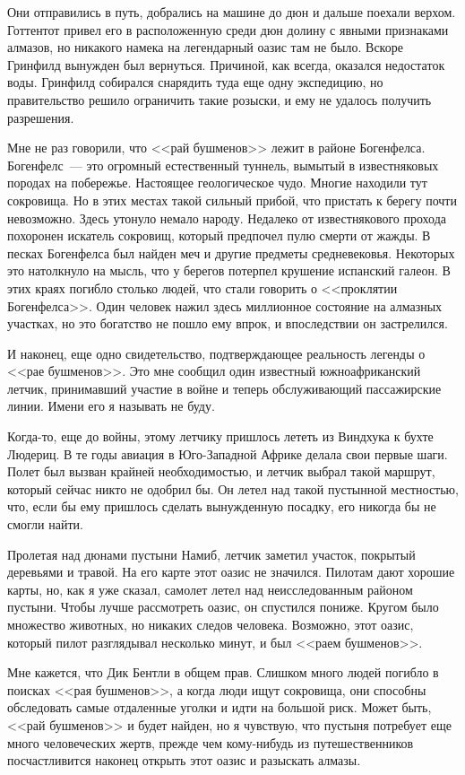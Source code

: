 \documentclass[12pt,a4paper,twoside,openany,svgnames]{memoir}
\begin{document}
Они отправились в путь, добрались на машине до дюн и дальше поехали верхом. Готтентот привел его в расположенную среди дюн долину с явными признаками алмазов, но никакого намека на легендарный оазис там не было. Вскоре Гринфилд вынужден был вернуться. Причиной, как всегда, оказался недостаток воды. Гринфилд собирался снарядить туда еще одну экспедицию, но правительство решило ограничить такие розыски, и ему не удалось получить разрешения.

Мне не раз говорили, что <<рай бушменов>> лежит в районе Богенфелса. Богенфелс~--- это огромный естественный туннель, вымытый в известняковых породах на побережье. Настоящее геологическое чудо. Многие находили тут сокровища. Но в этих местах такой сильный прибой, что пристать к берегу почти невозможно. Здесь утонуло немало народу. Недалеко от известнякового прохода похоронен искатель сокровищ, который предпочел пулю смерти от жажды. В песках Богенфелса был найден меч и другие предметы средневековья. Некоторых это натолкнуло на мысль, что у берегов потерпел крушение испанский галеон. В этих краях погибло столько людей, что стали говорить о <<проклятии Богенфелса>>. Один человек нажил здесь миллионное состояние на алмазных участках, но это богатство не пошло ему впрок, и впоследствии он застрелился.

И наконец, еще одно свидетельство, подтверждающее реальность легенды о <<рае бушменов>>. Это мне сообщил один известный южноафриканский летчик, принимавший участие в войне и теперь обслуживающий пассажирские линии. Имени его я называть не буду.

Когда-то, еще до войны, этому летчику пришлось лететь из Виндхука к бухте Людериц. В те годы авиация в Юго-Западной Африке делала свои первые шаги. Полет был вызван крайней необходимостью, и летчик выбрал такой маршрут, который сейчас никто не одобрил бы. Он летел над такой пустынной местностью, что, если бы ему пришлось сделать вынужденную посадку, его никогда бы не смогли найти.

Пролетая над дюнами пустыни Намиб, летчик заметил участок, покрытый деревьями и травой. На его карте этот оазис не значился. Пилотам дают хорошие карты, но, как я уже сказал, самолет летел над неисследованным районом пустыни. Чтобы лучше рассмотреть оазис, он спустился пониже. Кругом было множество животных, но никаких следов человека. Возможно, этот оазис, который пилот разглядывал несколько минут, и был <<раем бушменов>>.

Мне кажется, что Дик Бентли в общем прав. Слишком много людей погибло в поисках <<рая бушменов>>, а когда люди ищут сокровища, они способны обследовать самые отдаленные уголки и идти на большой риск. Может быть, <<рай бушменов>> и будет найден, но я чувствую, что пустыня потребует еще много человеческих жертв, прежде чем кому-нибудь из путешественников посчастливится наконец открыть этот оазис и разыскать алмазы.
\end{document}
